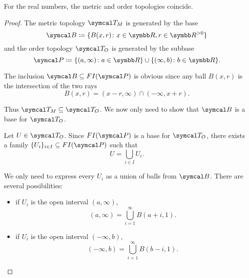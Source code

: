 \begin{theorem}\label{thm:real_metric_and_order_topologies_coincide}
  For the real numbers, the metric and order topologies coincide.
\end{theorem}
\begin{proof}
  The metric topology \( \Cal{T}_M \) is generated by the base
  \begin{equation*}
    \Cal{B} \coloneqq \{ B(x, r) \colon x \in \R, r \in \R^{>0} \}
  \end{equation*}
  and the order topology \( \Cal{T}_O \) is generated by the subbase
  \begin{equation*}
    \Cal{P} \coloneqq \{ (a, \infty) \colon a \in \R \} \cup \{ (\infty, b) \colon b \in \R \}.
  \end{equation*}

  The inclusion \( \Cal{B} \subseteq FI(\Cal{P}) \) is obvious since any ball \( B(x, r) \) is the intersection of the two rays
  \begin{equation*}
    B(x, r) = (x - r, \infty) \cap (-\infty, x + r).
  \end{equation*}

  Thus \( \Cal{T}_M \subseteq \Cal{T}_O \). We now only need to show that \( \Cal{B} \) is a base for \( \Cal{T}_O \).

  Let \( U \in \Cal{T}_O \). Since \( FI(\Cal{P}) \) is a base for \( \Cal{T}_O \), there exists a family \( \{ U_i \}_{i \in I} \subseteq FI(\Cal{P}) \) such that
  \begin{equation*}
    U = \bigcup_{i \in I} U_i.
  \end{equation*}

  We only need to express every \( U_i \) as a union of balls from \( \Cal{B} \). There are several possibilities:
  \begin{itemize}
    \item if \( U_i \) is the open interval \( (a, \infty) \),
    \begin{equation*}
      (a, \infty) = \bigcup_{i=1}^\infty B(a + i, 1).
    \end{equation*}

    \item if \( U_i \) is the open interval \( (-\infty, b) \),
    \begin{equation*}
      (-\infty, b) = \bigcup_{i=1}^\infty B(b - i, 1).
    \end{equation*}


\end{itemize}
\end{proof}
